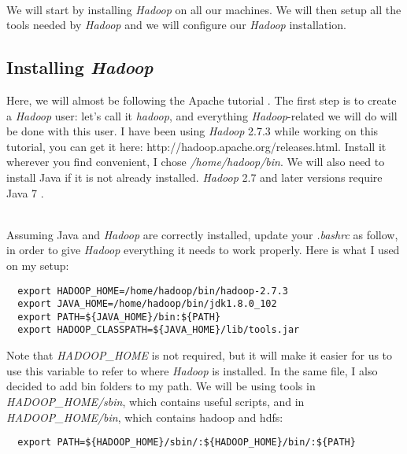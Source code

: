 \documentclass[a4paper, 12pt]{article}
\begin{document}
~\\
We will start by installing \textit{Hadoop} on all our machines. We will then setup all the tools needed by \textit{Hadoop} and we will configure our \textit{Hadoop} installation.

  \subsection{Installing \textit{Hadoop}}
  
Here, we will almost be following the Apache tutorial \cite{hadoop_single_node_setup}. The first step is to create a \textit{Hadoop} user: let's call it \textit{hadoop}, and everything \textit{Hadoop}-related we will do will be done with this user. I have been using \textit{Hadoop} 2.7.3 while working on this tutorial, you can get it here: http://hadoop.apache.org/releases.html. Install it wherever you find convenient, I chose \textit{/home/hadoop/bin}. We will also need to install Java if it is not already installed. \textit{Hadoop} 2.7 and later versions require Java 7 \cite{hadoop_java_versions}.

~\\
Assuming Java and \textit{Hadoop} are correctly installed, update your \textit{.bashrc} as follow, in order to give \textit{Hadoop} everything it needs to work properly. Here is what I used on my setup:

\begin{verbatim}
  export HADOOP_HOME=/home/hadoop/bin/hadoop-2.7.3
  export JAVA_HOME=/home/hadoop/bin/jdk1.8.0_102
  export PATH=${JAVA_HOME}/bin:${PATH}
  export HADOOP_CLASSPATH=${JAVA_HOME}/lib/tools.jar
\end{verbatim}

Note that \textit{HADOOP\_HOME} is not required, but it will make it easier for us to use this variable to refer to where \textit{Hadoop} is installed.  In the same file, I also decided to add bin folders to my path. We will be using tools in \textit{HADOOP\_HOME/sbin}, which contains useful scripts, and in \textit{HADOOP\_HOME/bin}, which contains hadoop and hdfs:

\begin{verbatim}
  export PATH=${HADOOP_HOME}/sbin/:${HADOOP_HOME}/bin/:${PATH}
\end{verbatim}
\end{document}
